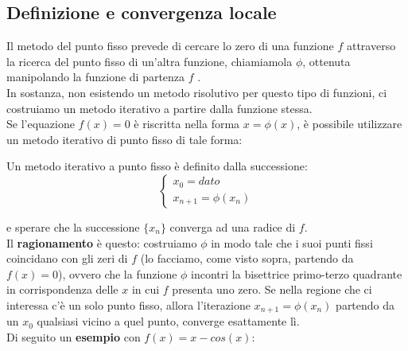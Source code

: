 \documentclass[12pt,a4paper,]{report}
\begin{document}
\subsection{Definizione e convergenza locale}
Il metodo del punto fisso prevede di cercare lo zero di una funzione $f$ attraverso la ricerca del punto fisso di un'altra funzione, chiamiamola $\phi$, ottenuta manipolando la funzione di partenza $f$ .\\
In sostanza, non esistendo un metodo risolutivo per questo tipo di funzioni, ci costruiamo un metodo iterativo a partire dalla funzione stessa.\\
Se l'equazione $f (x) = 0$ è riscritta nella forma $x = \phi(x)$, è possibile utilizzare un metodo iterativo di punto fisso di tale forma:
\begin{definizione}
    Un metodo iterativo a punto fisso è definito dalla successione:
    \[
    \begin{cases}
        x_0 = dato\\
        x_{n+1} = \phi(x_n)
    \end{cases}
    \]
\end{definizione}
\noindent
e sperare che la successione $\{x_n\}$ converga ad una radice di $f$.\\
Il \textbf{ragionamento} è questo: costruiamo $\phi$ in modo tale che i suoi punti fissi coincidano con gli zeri di $f$ (lo facciamo, come visto sopra, partendo da $f (x) = 0$), ovvero che la funzione $\phi$ incontri la bisettrice primo-terzo quadrante in corrispondenza delle $x$ in cui $f$ presenta uno zero. Se nella regione che ci interessa c'è un solo punto fisso, allora l'iterazione
$x_{n+1} = \phi(x_n)$ 
partendo da un $x_0$ qualsiasi vicino a quel punto, converge esattamente lì.\\
Di seguito un \textbf{esempio} con $f(x) = x- cos(x)$:
\end{document}
